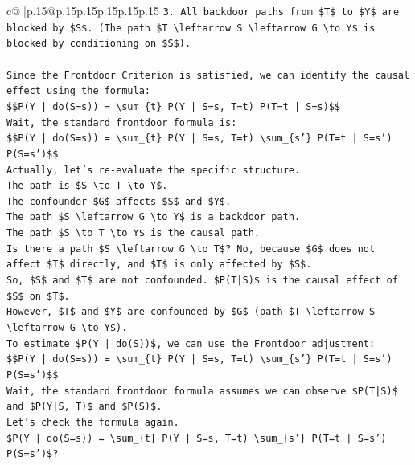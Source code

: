 \documentclass{article}
\begin{document}
{\begin{supertabular}{c@{$\;$}|p{.15\linewidth}@{}p{.15\linewidth}p{.15\linewidth}p{.15\linewidth}p{.15\linewidth}p{.15\linewidth}}
{{{\texttt{3.  All backdoor paths from \$T\$ to \$Y\$ are blocked by \$S\$. (The path \$T \textbackslash{}leftarrow S \textbackslash{}leftarrow G \textbackslash{}to Y\$ is blocked by conditioning on \$S\$).} \\
\\ 
\texttt{Since the Frontdoor Criterion is satisfied, we can identify the causal effect using the formula:} \\
\texttt{\$\$P(Y | do(S=s)) = \textbackslash{}sum\_\{t\} P(Y | S=s, T=t) P(T=t | S=s)\$\$} \\
\texttt{Wait, the standard frontdoor formula is:} \\
\texttt{\$\$P(Y | do(S=s)) = \textbackslash{}sum\_\{t\} P(Y | S=s, T=t) \textbackslash{}sum\_\{s'\} P(T=t | S=s') P(S=s')\$\$} \\
\texttt{Actually, let's re{-}evaluate the specific structure.} \\
\texttt{The path is \$S \textbackslash{}to T \textbackslash{}to Y\$.} \\
\texttt{The confounder \$G\$ affects \$S\$ and \$Y\$.} \\
\texttt{The path \$S \textbackslash{}leftarrow G \textbackslash{}to Y\$ is a backdoor path.} \\
\texttt{The path \$S \textbackslash{}to T \textbackslash{}to Y\$ is the causal path.} \\
\texttt{Is there a path \$S \textbackslash{}leftarrow G \textbackslash{}to T\$? No, because \$G\$ does not affect \$T\$ directly, and \$T\$ is only affected by \$S\$.} \\
\texttt{So, \$S\$ and \$T\$ are not confounded. \$P(T|S)\$ is the causal effect of \$S\$ on \$T\$.} \\
\texttt{However, \$T\$ and \$Y\$ are confounded by \$G\$ (path \$T \textbackslash{}leftarrow S \textbackslash{}leftarrow G \textbackslash{}to Y\$).} \\
\texttt{To estimate \$P(Y | do(S))\$, we can use the Frontdoor adjustment:} \\
\texttt{\$\$P(Y | do(S=s)) = \textbackslash{}sum\_\{t\} P(Y | S=s, T=t) \textbackslash{}sum\_\{s'\} P(T=t | S=s') P(S=s')\$\$} \\
\texttt{Wait, the standard frontdoor formula assumes we can observe \$P(T|S)\$ and \$P(Y|S, T)\$ and \$P(S)\$.} \\
\texttt{Let's check the formula again.} \\
\texttt{\$P(Y | do(S=s)) = \textbackslash{}sum\_\{t\} P(Y | S=s, T=t) \textbackslash{}sum\_\{s'\} P(T=t | S=s') P(S=s')\$?} \\
}}}
\end{supertabular}}
\end{document}
